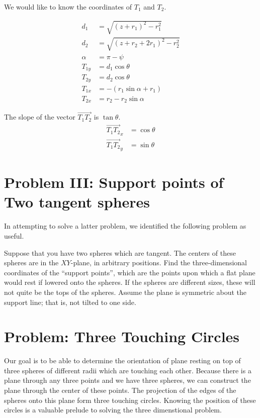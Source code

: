 \documentclass{article}
\begin{document}
We would like to know the coordinates of $T_1$ and $T_2$.

\begin{align}
  d_1 &= \sqrt{(z+r_1)^2 - r_1^2} \\
  d_2 &= \sqrt{(z+r_2+2r_1)^2 - r_2^2} \\
  \alpha &= \pi - \psi \\
  T_{1y} &= d_1\cos{\theta} \\
  T_{2y} &= d_2\cos{\theta} \\
  T_{1x} &= - (r_1\sin{\alpha} + r_1) \\
  T_{2x} &= r_2 - r_2\sin{\alpha}
\end{align}


The slope of the vector $\overrightarrow{T_1T_2}$ is $\tan{\theta}$.
  \begin{align}
    \overrightarrow{T_1T_2}_x &= \cos{\theta} \\
    \overrightarrow{T_1T_2}_y &= \sin{\theta}
    \end{align}

  \section{Problem III: Support points of Two tangent spheres }

  In attempting to solve a latter problem, we identified the following problem as useful.

  Suppose that you have two spheres which are tangent. The centers of these spheres are
  in the $XY$-plane, in arbitrary positions.   Find the three-dimensional coordinates
  of the ``support points'', which are the points upon which a flat plane would rest
  if lowered onto the spheres. If the spheres are different sizes, these will not quite
  be the tops of the spheres.  Assume the plane is symmetric about the support line; that
  is, not tilted to one side.



\section{Problem: Three Touching Circles}

Our goal is to be able to determine the orientation of plane resting on top of three spheres of different radii which are touching each
other.
Because there is a plane through any three points and we have three spheres, we can construct the plane through
the center of these points.
The projection of the edges of the spheres onto this plane form three touching circles.
Knowing the position of these circles is a valuable prelude to solving the three dimenstional problem.
\end{document}
